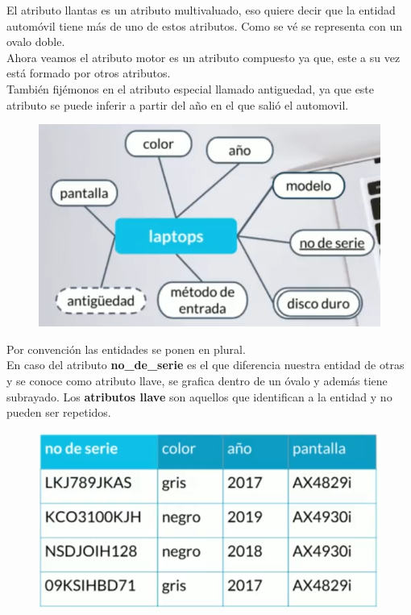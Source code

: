 \documentclass{article}
\begin{document}
El atributo llantas es un atributo multivaluado, eso quiere decir que la
entidad automóvil tiene más de uno de estos atributos. Como se vé se representa
con un ovalo doble.\\

Ahora veamos el atributo motor es un atributo compuesto ya que, este a su vez
está formado por otros atributos.\\

También fijémonos en el atributo especial llamado antiguedad, ya que este
atributo se puede inferir a partir del año en el que salió el automovil.

\newpage

\begin{figure}[h!]
    \centering
      \includegraphics[scale=0.5]{./Pictures/003_atributos.png}
\end{figure}

Por convención las entidades se ponen en plural.\\

En caso del atributo \textbf{no\_de\_serie} es el que diferencia nuestra
entidad de otras y se conoce como atributo llave, se grafica dentro de un óvalo
y además tiene subrayado. Los \textbf{atributos llave} son aquellos que identifican a la entidad y no
pueden ser repetidos.

\begin{figure}[h!]
    \centering
      \includegraphics[scale=0.5]{./Pictures/004_id.png}
\end{figure}
\end{document}
